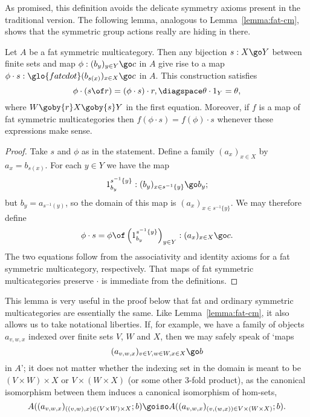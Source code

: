 As promised, this definition avoids the delicate symmetry axioms present in
the traditional version.  The following lemma, analogous to
Lemma~\ref{lemma:fat-cm}, shows that the symmetric group actions really are
hiding in there.
%
\begin{lemma}	
Let $A$ be a fat symmetric multicategory.  Then any bijection $s: X \go Y$
between finite sets and map $\phi: (b_y)_{y\in Y} \go c$ in $A$ give rise
to a map $\phi\cdot s:%
% 
\glo{fatcdot}
% 
(b_{s(x)})_{x\in X} \go c$ in $A$.  This
construction satisfies
\[
\phi\cdot (s\of r) = (\phi\cdot s)\cdot r,
\diagspace
\theta \cdot 1_Y = \theta,
\]
where $W \goby{r} X \goby{s} Y$ in the first equation.  Moreover, if $f$ is a
map of fat symmetric multicategories then $f(\phi\cdot s) = f(\phi)\cdot s$
whenever these expressions make sense.  
\end{lemma}
%
\begin{proof}
Take $s$ and $\phi$ as in the statement.  Define a family $(a_x)_{x\in X}$
by $a_x = b_{s(x)}$.  For each $y\in Y$ we have the map
\[
1_{b_y}^{s^{-1}\{y\}}: 
(b_y)_{x\in s^{-1}\{y\}} \go b_y;
\]
but $b_y = a_{s^{-1}(y)}$, so the domain of this map is $(a_x)_{x\in
s^{-1}\{y\}}$.  We may therefore define
\[
\phi\cdot s = 
\phi\of \left( 1_{b_y}^{s^{-1}\{y\}} \right)_{y\in Y}:
(a_x)_{x\in X} \go c.
\]
The two equations follow from the associativity and identity axioms
for a fat symmetric multicategory, respectively.  That maps of fat
symmetric multicategories preserve $\cdot$ is immediate from the
definitions. 
\done
\end{proof}
%
This lemma is very useful in the proof below that fat and ordinary
symmetric multicategories are essentially the same.  Like
Lemma~\ref{lemma:fat-cm}, it also allows us to take notational liberties.
If, for example, we have a family of objects $a_{v,w,x}$ indexed over
finite sets $V$, $W$ and $X$, then we may safely speak of `maps
\[
(a_{v,w,x})_{v\in V, w\in W, x\in X} \go b
\]
in $A$'; it does not matter whether the indexing set in the domain is
meant to be $(V\times W)\times X$ or $V\times (W\times X)$ (or some other
3-fold product), as the canonical isomorphism between them induces a
canonical isomorphism of hom-sets,
\[
A((a_{v,w,x})_{((v,w),x) \in (V\times W) \times X} ; b)
\goiso
A((a_{v,w,x})_{(v,(w,x)) \in V\times (W \times X)} ; b).
\]

